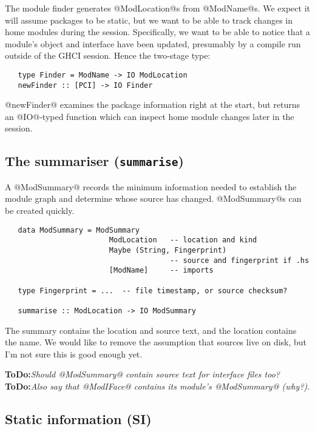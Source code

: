 \documentclass[11pt]{article}
\newcommand{\ToDo}[1]{{{\bf ToDo:}\sl #1}}
\begin{document}
The module finder generates @ModLocation@s from @ModName@s.  We expect
it will assume packages to be static, but we want to be able to track
changes in home modules during the session.  Specifically, we want to
be able to notice that a module's object and interface have been
updated, presumably by a compile run outside of the GHCI session.
Hence the two-stage type:
\begin{verbatim}
   type Finder = ModName -> IO ModLocation
   newFinder :: [PCI] -> IO Finder
\end{verbatim}
@newFinder@ examines the package information right at the start, but 
returns an @IO@-typed function which can inspect home module changes
later in the session.


\subsection{The summariser (\mbox{\tt summarise})}
\label{sec:summariser}

A @ModSummary@ records the minimum information needed to establish the
module graph and determine whose source has changed.  @ModSummary@s
can be created quickly.
\begin{verbatim}
   data ModSummary = ModSummary 
                        ModLocation   -- location and kind
                        Maybe (String, Fingerprint)
                                      -- source and fingerprint if .hs
                        [ModName]     -- imports

   type Fingerprint = ...  -- file timestamp, or source checksum?

   summarise :: ModLocation -> IO ModSummary
\end{verbatim}

The summary contains the location and source text, and the location
contains the name.  We would like to remove the assumption that
sources live on disk, but I'm not sure this is good enough yet.

\ToDo{Should @ModSummary@ contain source text for interface files too?}
\ToDo{Also say that @ModIFace@ contains its module's @ModSummary@  (why?).}


\subsection{Static information (SI)}
\label{sec:staticinfo}
\end{document}
